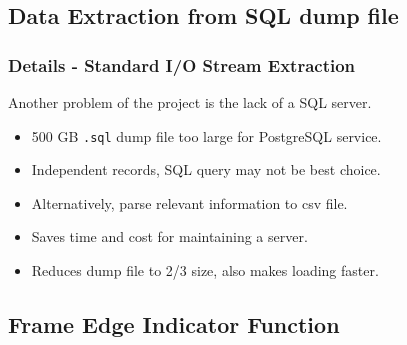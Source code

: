 \documentclass{beamer}[fullspacing]
\begin{document}
\subsection{Data Extraction from SQL dump file}

\begin{frame}
\frametitle{Details - Standard I/O Stream Extraction}

Another problem of the project is the lack of a SQL server.
\begin{itemize}
\item
500 GB {\tt .sql} dump file too large for PostgreSQL service.
\item
Independent records, SQL query may not be best choice.
\item
Alternatively, parse relevant information to csv file.
\item
Saves time and cost for maintaining a server.
\item
Reduces dump file to 2/3 size, also makes loading faster.
\end{itemize}

\end{frame}



\subsection{Frame Edge Indicator Function}
\end{document}

